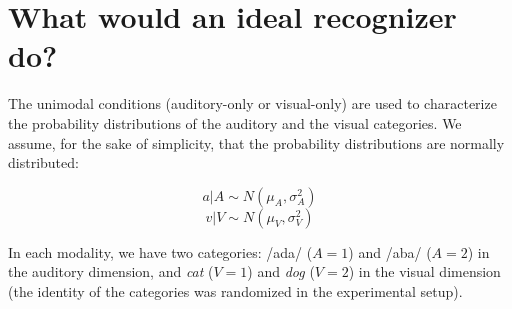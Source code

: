 \documentclass[10pt,letterpaper]{article}
\begin{document}
\section{What would an ideal recognizer do?}
 
The unimodal conditions (auditory-only or visual-only)  are used to characterize the probability distributions of the auditory and the visual categories.  We assume, for the sake of simplicity, that the probability distributions are normally distributed:

$$ a | A \sim  N(\mu_A, \sigma^2_A) $$
$$ v | V \sim  N(\mu_V, \sigma^2_V) $$

In each modality, we have two categories: /ada/ ($A=1$) and /aba/ ($A=2$) in the auditory dimension, and \textit{cat} ($V=1$) and \textit{dog} ($V=2$) in the visual dimension (the identity of the categories was randomized in the experimental setup).
\end{document}
